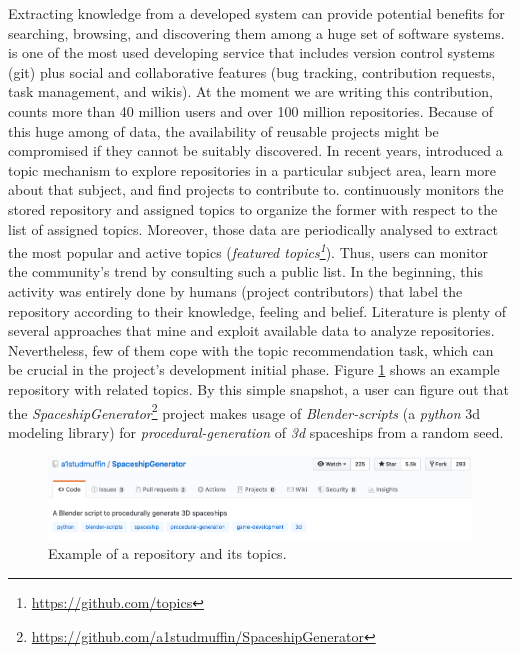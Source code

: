 Extracting knowledge from a developed system can provide potential benefits for searching, browsing, and discovering them among a huge set of software systems.
\GH is one of the most used developing service that includes version control systems (\ie git) plus social and collaborative features (\eg bug tracking, contribution requests, task management, and wikis).
At the moment we are writing this contribution, \GH counts more than 40 million users and over 100 million repositories. Because of this huge among of data, the availability of reusable projects might be compromised if they cannot be suitably discovered. In recent years, \GH introduced a topic mechanism to explore repositories in a particular subject area, learn more about that subject, and find projects to contribute to.
\GH continuously monitors the stored repository and assigned topics to organize the former with respect to the list of assigned topics. Moreover, those data are periodically analysed to extract the most popular and active topics (\ie \emph{featured topics\footnote{\url{https://github.com/topics}}}). Thus, users can monitor the community’s trend by consulting such a public list. In the beginning, this activity was entirely done by humans (\ie project contributors) that label the repository according to their knowledge, feeling and belief. Literature is plenty of several approaches that mine and exploit available data to analyze repositories. Nevertheless, few of them cope with the topic recommendation task, which can be crucial in the project's development initial phase. Figure \ref{fig:SpaceshipGenerator} shows an example repository with related topics. By this simple snapshot, a \GH user can figure out that the \emph{SpaceshipGenerator}\footnote{\label{note:spaceship}\url{https://github.com/a1studmuffin/SpaceshipGenerator}} project makes usage of \emph{Blender-scripts} (\ie a \emph{python} 3d modeling library) for \emph{procedural-generation} of \emph{3d} spaceships from a random seed.



\begin{figure}[h!]
	\centering
	\includegraphics[width=0.99\linewidth]{figs/SpaceshipGenerator.png}
	\caption{Example of a \GH repository and its topics.}
	\label{fig:SpaceshipGenerator}
\end{figure}



